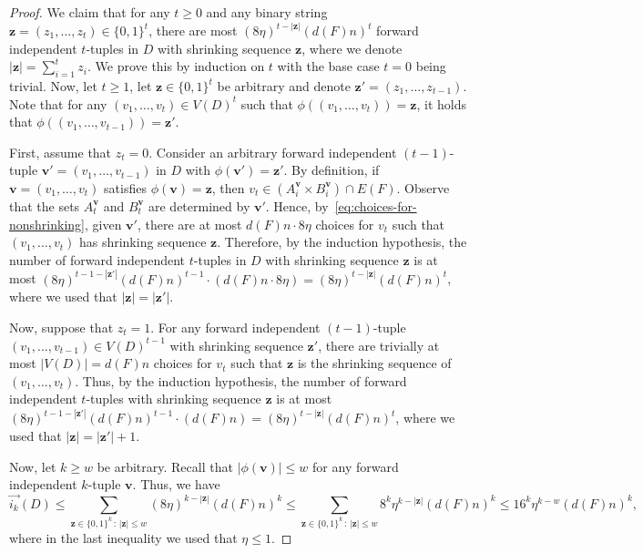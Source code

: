 \documentclass{article}
\theoremstyle{plain}
\theoremstyle{definition}
\newcommand{\bz}{\mathbf{z}}
\newcommand{\bv}{\mathbf{v}}
\newcommand{\fwi}[1]{\overrightarrow{i_{#1}}}
\begin{document}
\begin{proof}
    We claim that for any $t \ge 0$ and any binary string $\bz = (z_1, \dots, z_t) \in \{0, 1\}^t$, there are most $(8 \eta)^{t-|\bz|} (d(F) n)^t$ forward independent $t$-tuples in $D$ with shrinking sequence $\bz$, where we denote $|\bz| = \sum_{i=1}^t z_i$. We prove this by induction on $t$ with the base case $t=0$ being trivial. Now, let $t \ge 1$, let $\bz \in \{0, 1\}^t$ be arbitrary and denote $\bz' = (z_1, \dots, z_{t-1})$. Note that for any $(v_1, \dots, v_t) \in V(D)^t$ such that $\phi((v_1, \dots, v_t)) = \bz$, it holds that $\phi((v_1, \dots, v_{t-1})) = \bz'$.
    
    First, assume that $z_t = 0$. Consider an arbitrary forward independent $(t-1)$-tuple $\bv' = (v_1, \dots, v_{t-1})$ in $D$ with $\phi(\bv') = \bz'$. By definition, if $\bv = (v_1, \dots, v_t)$ satisfies $\phi(\bv) = \bz$, then $v_t \in (A^\bv_i \times B^\bv_i) \cap E(F)$. Observe that the sets $A^\bv_t$ and $B^\bv_t$ are determined by $\bv'$. Hence, by~\eqref{eq:choices-for-nonshrinking}, given $\bv'$, there are at most $d(F) n \cdot 8 \eta$ choices for $v_t$ such that $(v_1, \dots, v_t)$ has shrinking sequence $\bz$. Therefore, by the induction hypothesis, the number of forward independent $t$-tuples in $D$ with shrinking sequence $\bz$ is at most $(8 \eta)^{t-1-|\bz'|} (d(F) n)^{t-1} \cdot (d(F) n \cdot 8 \eta) = (8 \eta)^{t-|\bz|} (d(F) n)^t$, where we used that $|\bz| = |\bz'|.$
    
    Now, suppose that $z_t=1$. For any forward independent $(t-1)$-tuple $(v_1, \dots, v_{t-1}) \in V(D)^{t-1}$ with shrinking sequence $\bz'$, there are trivially at most $|V(D)| = d(F) n$ choices for $v_t$ such that $\bz$ is the shrinking sequence of $(v_1, \dots, v_t)$. Thus, by the induction hypothesis, the number of forward independent $t$-tuples with shrinking sequence $\bz$ is at most $(8 \eta)^{t-1-|\bz'|} (d(F) n)^{t-1} \cdot (d(F) n) = (8\eta)^{t - |\bz|} (d(F)n)^t$, where we used that $|\bz| = |\bz'| + 1$.

    Now, let $k \ge w$ be arbitrary. Recall that $|\phi(\bv)| \le w$ for any forward independent $k$-tuple $\bv$. Thus, we have
    \[ \fwi{k}(D) \le \sum_{\bz \in \{0,1\}^k \, \colon \, |\bz| \le w} (8 \eta)^{k-|\bz|} (d(F) n)^k \le \sum_{\bz \in \{0,1\}^k \, \colon \, |\bz| \le w} 8^k \eta^{k-|\bz|} (d(F) n)^k \le 16^k \eta^{k-w} (d(F)n)^k, \]
    where in the last inequality we used that $\eta \le 1$.
\end{proof}
\end{document}
